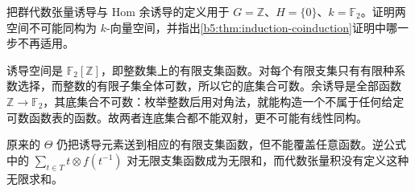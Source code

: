\begin{exercise}\label{b5:ex:03-infinite-index}
	把群代数张量诱导与 Hom 余诱导的定义用于 \(G=\mathbb Z\)、\(H=\{0\}\)、\(k=\mathbb F_2\)。证明两空间不可能同构为 \(k\)-向量空间，并指出\cref{b5:thm:induction-coinduction}证明中哪一步不再适用。
\end{exercise}
\begin{solution}
	诱导空间是 \(\mathbb F_2[\mathbb Z]\)，即整数集上的有限支集函数。对每个有限支集只有有限种系数选择，而整数的有限子集全体可数，所以它的底集合可数。余诱导是全部函数 \(\mathbb Z\rightarrow\mathbb F_2\)，其底集合不可数：枚举整数后用对角法，就能构造一个不属于任何给定可数函数表的函数。故两者连底集合都不能双射，更不可能有线性同构。

	原来的 \(\Theta\) 仍把诱导元素送到相应的有限支集函数，但不能覆盖任意函数。逆公式中的 \(\sum_{t\in T}t\otimes f(t^{-1})\) 对无限支集函数成为无限和，而代数张量积没有定义这种无限求和。
\end{solution}
